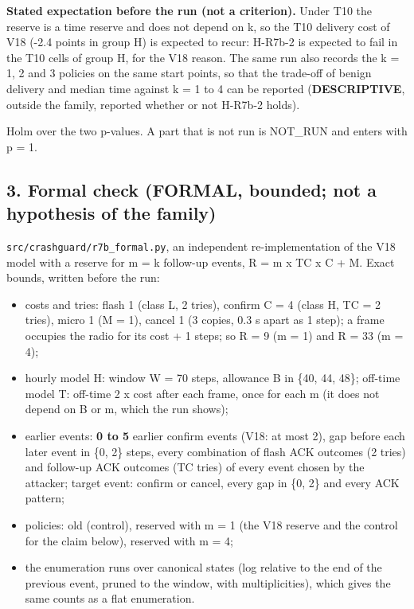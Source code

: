 \textbf{Stated expectation before the run (not a criterion).} Under T10 the reserve is a time reserve and does not depend on k, so the T10 delivery cost of V18 (-2.4 points in group H) is expected to recur: H-R7b-2 is expected to fail in the T10 cells of group H, for the V18 reason. The same run also records the k = 1, 2 and 3 policies on the same start points, so that the trade-off of benign delivery and median time against k = 1 to 4 can be reported (\textbf{DESCRIPTIVE}, outside the family, reported whether or not H-R7b-2 holds).

Holm over the two p-values. A part that is not run is NOT\_RUN and enters with p = 1.

\subsection*{3. Formal check (FORMAL, bounded; not a hypothesis of the family)}

\texttt{src/crashguard/r7b\_formal.py}, an independent re-implementation of the V18 model with a reserve for m = k follow-up events, R = m x TC x C + M. Exact bounds, written before the run:
\begin{itemize}
\item costs and tries: flash 1 (class L, 2 tries), confirm C = 4 (class H, TC = 2 tries), micro 1 (M = 1), cancel 1 (3 copies, 0.3 s apart as 1 step); a frame occupies the radio for its cost + 1 steps; so R = 9 (m = 1) and R = 33 (m = 4);
\item hourly model H: window W = 70 steps, allowance B in \{40, 44, 48\}; off-time model T: off-time 2 x cost after each frame, once for each m (it does not depend on B or m, which the run shows);
\item earlier events: \textbf{0 to 5} earlier confirm events (V18: at most 2), gap before each later event in \{0, 2\} steps, every combination of flash ACK outcomes (2 tries) and follow-up ACK outcomes (TC tries) of every event chosen by the attacker; target event: confirm or cancel, every gap in \{0, 2\} and every ACK pattern;
\item policies: old (control), reserved with m = 1 (the V18 reserve and the control for the claim below), reserved with m = 4;
\item the enumeration runs over canonical states (log relative to the end of the previous event, pruned to the window, with multiplicities), which gives the same counts as a flat enumeration.
\end{itemize}

